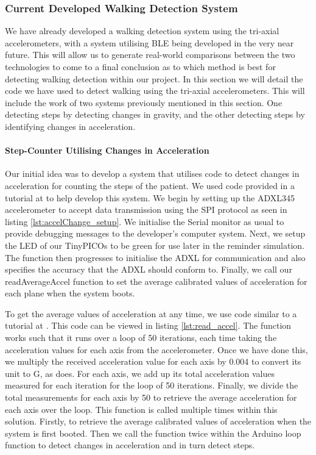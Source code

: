 {\subsubsection{Current Developed Walking Detection System}

We have already developed a walking detection system using the tri-axial accelerometers, with a system utilising BLE being developed in the very near future. This will allow us to generate real-world comparisons between the two technologies to come to a final conclusion as to which method is best for detecting walking detection within our project. In this section we will detail the code we have used to detect walking using the tri-axial accelerometers. This will include the work of two systems previously mentioned in this section. One detecting steps by detecting changes in gravity, and the other detecting steps by identifying changes in acceleration.

\paragraph{Step-Counter Utilising Changes in Acceleration}

Our initial idea was to develop a system that utilises code to detect changes in acceleration for counting the steps of the patient. We used code provided in a tutorial at \cite{agnihotri_2021} to help develop this system. We begin by setting up the ADXL345 accelerometer to accept data transmission using the SPI protocol as seen in listing \ref{lst:accelChange_setup}. We initialise the Serial monitor as usual to provide debugging messages to the developer's computer system. Next, we setup the LED of our TinyPICOs to be green for use later in the reminder simulation. The function then progresses to initialise the ADXL for communication and also specifies the accuracy that the ADXL should conform to. Finally, we call our readAverageAccel function to set the average calibrated values of acceleration for each plane when the system boots.



To get the average values of acceleration at any time, we use code similar to a tutorial at \cite{agnihotri_2021}. This code can be viewed in listing \ref{lst:read_accel}. The function works such that it runs over a loop of 50 iterations, each time taking the acceleration values for each axis from the accelerometer. Once we have done this, we multiply the received acceleration value for each axis by 0.004 to convert its unit to G, as \cite{agnihotri_2021} does. For each axis, we add up its total acceleration values measured for each iteration for the loop of 50 iterations. Finally, we divide the total measurements for each axis by 50 to retrieve the average acceleration for each axis over the loop. This function is called multiple times within this solution. Firstly, to retrieve the average calibrated values of acceleration when the system is first booted. Then we call the function twice within the Arduino loop function to detect changes in acceleration and in turn detect steps.

}
